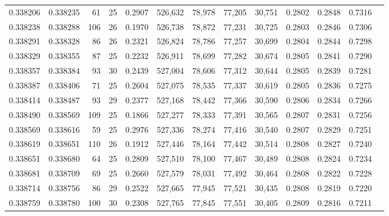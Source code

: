 \begin{tabular}{rrrrrrrrrrrrr}
0.338206 & 0.338235 &    61 &  25 &                                     0.2907 & 526,632 &  78,978 &  77,205 &  30,751 & 0.2802 & 0.2848 & 0.7316 \\
0.338238 & 0.338288 &   106 &  26 &                                     0.1970 & 526,738 &  78,872 &  77,231 &  30,725 & 0.2803 & 0.2846 & 0.7306 \\
0.338291 & 0.338328 &    86 &  26 &                                     0.2321 & 526,824 &  78,786 &  77,257 &  30,699 & 0.2804 & 0.2844 & 0.7298 \\
0.338329 & 0.338355 &    87 &  25 &                                     0.2232 & 526,911 &  78,699 &  77,282 &  30,674 & 0.2805 & 0.2841 & 0.7290 \\
0.338357 & 0.338384 &    93 &  30 &                                     0.2439 & 527,004 &  78,606 &  77,312 &  30,644 & 0.2805 & 0.2839 & 0.7281 \\
0.338387 & 0.338406 &    71 &  25 &                                     0.2604 & 527,075 &  78,535 &  77,337 &  30,619 & 0.2805 & 0.2836 & 0.7275 \\
0.338414 & 0.338487 &    93 &  29 &                                     0.2377 & 527,168 &  78,442 &  77,366 &  30,590 & 0.2806 & 0.2834 & 0.7266 \\
0.338490 & 0.338569 &   109 &  25 &                                     0.1866 & 527,277 &  78,333 &  77,391 &  30,565 & 0.2807 & 0.2831 & 0.7256 \\
0.338569 & 0.338616 &    59 &  25 &                                     0.2976 & 527,336 &  78,274 &  77,416 &  30,540 & 0.2807 & 0.2829 & 0.7251 \\
0.338619 & 0.338651 &   110 &  26 &                                     0.1912 & 527,446 &  78,164 &  77,442 &  30,514 & 0.2808 & 0.2827 & 0.7240 \\
0.338651 & 0.338680 &    64 &  25 &                                     0.2809 & 527,510 &  78,100 &  77,467 &  30,489 & 0.2808 & 0.2824 & 0.7234 \\
0.338681 & 0.338709 &    69 &  25 &                                     0.2660 & 527,579 &  78,031 &  77,492 &  30,464 & 0.2808 & 0.2822 & 0.7228 \\
0.338714 & 0.338756 &    86 &  29 &                                     0.2522 & 527,665 &  77,945 &  77,521 &  30,435 & 0.2808 & 0.2819 & 0.7220 \\
0.338759 & 0.338780 &   100 &  30 &                                     0.2308 & 527,765 &  77,845 &  77,551 &  30,405 & 0.2809 & 0.2816 & 0.7211 \\

\end{tabular}
